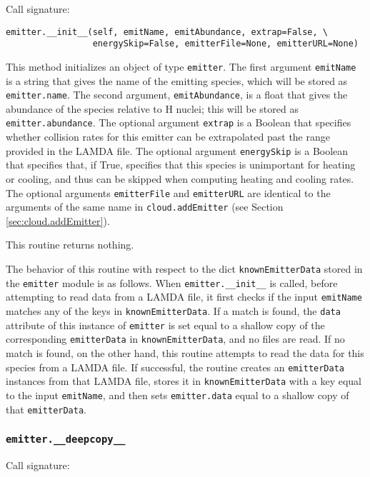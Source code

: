 \documentclass[12pt]{article}
\begin{document}
Call signature:

\begin{verbatim}
emitter.__init__(self, emitName, emitAbundance, extrap=False, \
                 energySkip=False, emitterFile=None, emitterURL=None)
\end{verbatim}

This method initializes an object of type \verb=emitter=. The first argument \verb=emitName= is a string that gives the name of the emitting species, which will be stored as \verb=emitter.name=. The second argument, \verb=emitAbundance=, is a float that gives the abundance of the species relative to H nuclei; this will be stored as \verb=emitter.abundance=. The optional argument \verb=extrap= is a Boolean that specifies whether collision rates for this emitter can be extrapolated past the range provided in the LAMDA file. The optional argument \verb=energySkip= is a Boolean that specifies that, if True, specifies that this species is unimportant for heating or cooling, and thus can be skipped when computing heating and cooling rates. The optional arguments \verb=emitterFile= and \verb=emitterURL= are identical to the arguments of the same name in \verb=cloud.addEmitter= (see Section \ref{sec:cloud.addEmitter}).

This routine returns nothing.

The behavior of this routine with respect to the dict \verb=knownEmitterData= stored in the \verb=emitter= module is as follows. When \verb=emitter.__init__= is called, before attempting to read data from a LAMDA file, it first checks if the input \verb=emitName= matches any of the keys in \verb=knownEmitterData=. If a match is found, the \verb=data= attribute of this instance of \verb=emitter= is set equal to a shallow copy of the corresponding \verb=emitterData= in \verb=knownEmitterData=, and no files are read. If no match is found, on the other hand, this routine attempts to read the data for this species from a LAMDA file. If successful, the routine creates an \verb=emitterData= instances from that LAMDA file, stores it in \verb=knownEmitterData= with a key equal to the input \verb=emitName=, and then sets \verb=emitter.data= equal to a shallow copy of that \verb=emitterData=.

\subsubsection{\texttt{emitter.\_\_deepcopy\_\_}}

Call signature:
\end{document}
